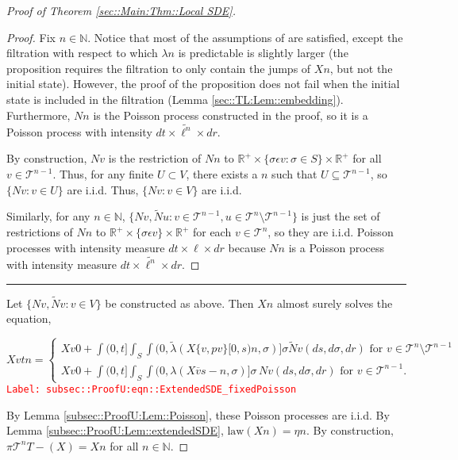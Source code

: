 \documentclass[12pt]{article}
\newcommand{\mb}{\mathbb}
\newcommand{\mc}{\mathcal}
\newcommand{\ov}{\overline}
\newcommand{\te}{\text}
\newcommand{\ep}{\epsilon}
\newcommand{\tr}{\textcolor{red}}
\newcommand{\labe}[1]{\tr{\texttt{Label: #1}}}
\newcommand{\ind}{\hspace{24pt}}
\newcommand{\lin}{\rule{\linewidth}{0.4 pt}}
\renewcommand{\v}{v}							%
\newcommand{\vv}{u}								%
\renewcommand{\U}{U}							%
\renewcommand{\S}{S}							%
\newcommand{\s}{\sigma}							%
\newcommand{\ev}{\ep}							%
\newcommand{\T}{T}								%
\renewcommand{\t}{t}							%
\newcommand{\proj}{\pi}							%
\renewcommand{\tt}{s}							%
\newcommand{\X}{X}								%
\newcommand{\cl}{\ov}							%
\newcommand{\tree}{\mc{T}}						%
\newcommand{\sln}[1]{^{#1}}						%
\newcommand{\poiss}{N}							%
\newcommand{\Sm}{\ell}							%
\newcommand{\rate}{\lambda}						%
\renewcommand{\r}{r}							%
\newcommand{\alt}[1]{\widetilde{#1}}			%
\newcommand{\mmm}{\eta}							%
\newcommand{\crate}{\alt{\lambda}}				%
\newcommand{\p}{p}								%
\begin{document}
\begin{proof}[Proof of Theorem \ref{sec::Main:Thm::Local SDE}]
\begin{proof}
Fix \(n \in \mb{N}\). Notice that most of the assumptions of \cite[Proposition 14.7.I(b)]{DalVer08} are satisfied, except the filtration with respect to which \(\rate{n}\) is predictable is slightly larger (the proposition requires the filtration to only contain the jumps of \(\X{}{}{n}\), but not the initial state). However, the proof of the proposition does not fail when the initial state is included in the filtration (Lemma \ref{sec::TL:Lem::embedding}). Furthermore, \(\poiss{n}\) is the Poisson process constructed in the proof, so it is a Poisson process with intensity \(d\t\times \alt{\Sm^n}\times d\r\).

\ind By construction, \(\poiss{\v}\) is the restriction of \(\poiss{n}\) to \(\mb{R}^+ \times \{\s\ev{\v}: \s\in \S\}\times \mb{R}^+\) for all \(\v\in \tree\sln{n-1}\). Thus, for any finite \(\U \subset V\), there exists a \(n\) such that \(\U \subseteq \tree\sln{n-1}\), so \(\{\poiss{\v}: \v\in \U\}\) are i.i.d. Thus, \(\{\poiss{\v}: \v\in V\}\) are i.i.d.

\ind Similarly, for any \(n \in \mb{N}\), \(\{\poiss{\v},\alt{\poiss}{\vv}: \v \in \tree\sln{n-1},\vv\in\tree\sln{n}\setminus\tree\sln{n-1}\}\) is just the set of restrictions of \(\poiss{n}\) to \(\mb{R}^+\times\{\s\ev{\v}\}\times\mb{R}^+\) for each \(\v\in \tree\sln{n}\), so they are i.i.d. Poisson processes with intensity measure \(d\t\times \Sm\times d\r\) because \(\poiss{n}\) is a Poisson process with intensity measure \(d\t\times\alt{\Sm^n}\times d\r\).
\end{proof}

\lin

Let \(\{\poiss{\v},\alt{\poiss}{\v}:\v\in V\}\) be constructed as above. Then \(\X{}{}{n}\) almost surely solves the equation,

\begin{equation}
\X{\v}{\t}{n} = \begin{cases}
\X{\v}{0}{} + \int{(0,\t]}\int_\S\int{(0,\crate{}{}(\X{\{\v,\p{\v}\}}{[0,\tt)}{n},\s)]}\s\alt{\poiss}{\v}(d\tt,d\s,d\r)\te{ for } \v \in \tree\sln{n}\setminus\tree\sln{n-1}\\
\X{\v}{0}{} + \int{(0,\t]}\int_\S\int{(0,\rate{}(\X{\cl{\v}}{\tt-}{n},\s)]}\s\,\poiss{\v}(d\tt,d\s,d\r)\te{ for } \v \in \tree\sln{n-1}.
\end{cases}
\label{subsec::ProofU:eqn::ExtendedSDE_fixedPoisson}
\end{equation}
\labe{subsec::ProofU:eqn::ExtendedSDE\_fixedPoisson}

By Lemma \ref{subsec::ProofU:Lem::Poisson}, these Poisson processes are i.i.d. By Lemma \ref{subsec::ProofU:Lem::extendedSDE}, \(\te{law}(\X{}{}{n}) = \mmm{}{}{n}\). By construction, \(\proj{\tree\sln{n}}{\T-}(\X{}{}) = \X{}{}{n}\) for all \(n\in\mb{N}\).


\end{proof}
\end{document}
